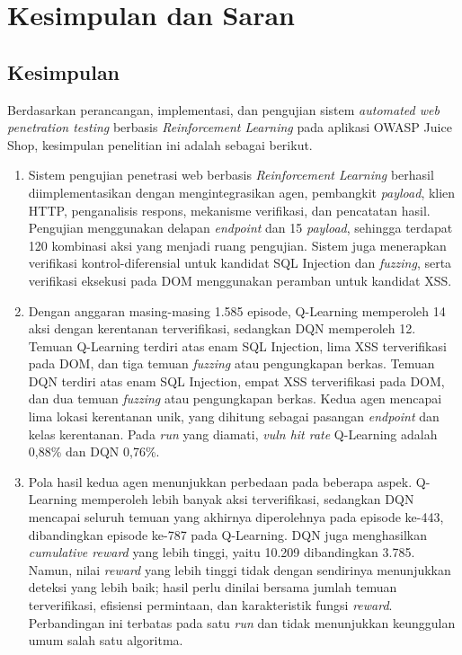 \chapter{Kesimpulan dan Saran}

\section{Kesimpulan}

Berdasarkan perancangan, implementasi, dan pengujian sistem \textit{automated web penetration testing} berbasis \textit{Reinforcement Learning} pada aplikasi OWASP Juice Shop, kesimpulan penelitian ini adalah sebagai berikut.

\begin{enumerate}
    \item Sistem pengujian penetrasi web berbasis \textit{Reinforcement Learning} berhasil diimplementasikan dengan mengintegrasikan agen, pembangkit \textit{payload}, klien HTTP, penganalisis respons, mekanisme verifikasi, dan pencatatan hasil. Pengujian menggunakan delapan \textit{endpoint} dan 15 \textit{payload}, sehingga terdapat 120 kombinasi aksi yang menjadi ruang pengujian. Sistem juga menerapkan verifikasi kontrol-diferensial untuk kandidat SQL Injection dan \textit{fuzzing}, serta verifikasi eksekusi pada DOM menggunakan peramban untuk kandidat XSS.

    \item Dengan anggaran masing-masing 1.585 episode, Q-Learning memperoleh 14 aksi dengan kerentanan terverifikasi, sedangkan DQN memperoleh 12. Temuan Q-Learning terdiri atas enam SQL Injection, lima XSS terverifikasi pada DOM, dan tiga temuan \textit{fuzzing} atau pengungkapan berkas. Temuan DQN terdiri atas enam SQL Injection, empat XSS terverifikasi pada DOM, dan dua temuan \textit{fuzzing} atau pengungkapan berkas. Kedua agen mencapai lima lokasi kerentanan unik, yang dihitung sebagai pasangan \textit{endpoint} dan kelas kerentanan. Pada \textit{run} yang diamati, \textit{vuln hit rate} Q-Learning adalah 0,88\% dan DQN 0,76\%.

    \item Pola hasil kedua agen menunjukkan perbedaan pada beberapa aspek. Q-Learning memperoleh lebih banyak aksi terverifikasi, sedangkan DQN mencapai seluruh temuan yang akhirnya diperolehnya pada episode ke-443, dibandingkan episode ke-787 pada Q-Learning. DQN juga menghasilkan \textit{cumulative reward} yang lebih tinggi, yaitu 10.209 dibandingkan 3.785. Namun, nilai \textit{reward} yang lebih tinggi tidak dengan sendirinya menunjukkan deteksi yang lebih baik; hasil perlu dinilai bersama jumlah temuan terverifikasi, efisiensi permintaan, dan karakteristik fungsi \textit{reward}. Perbandingan ini terbatas pada satu \textit{run} dan tidak menunjukkan keunggulan umum salah satu algoritma.


\end{enumerate}
